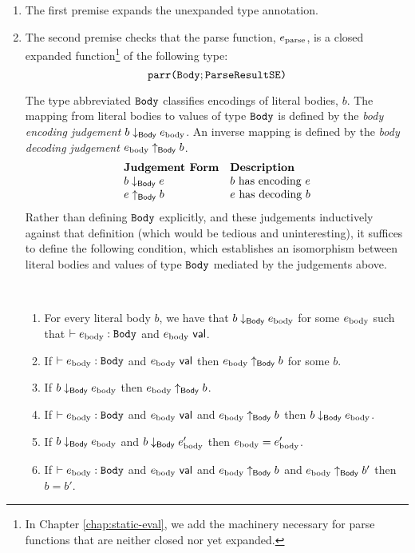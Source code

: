 \begin{enumerate}
\item The first premise expands the unexpanded type annotation.

\item The second premise checks that the parse function, $e_\text{parse}$, is a closed expanded function\footnote{In Chapter \ref{chap:static-eval}, we add the machinery necessary for parse functions that are neither closed nor yet expanded.} of the following type: \[\texttt{parr}\texttt{(}\mathtt{Body}; \mathtt{ParseResultSE}\texttt{)}\] 


The type abbreviated $\mathtt{Body}$ classifies encodings of literal bodies, $b$. The mapping from literal bodies to values of type $\mathtt{Body}$ is defined by the \emph{body encoding judgement} $b \downarrow_\mathsf{Body} e_\text{body}$. An inverse mapping is defined   by the \emph{body decoding judgement} $e_\text{body} \uparrow_\mathsf{Body} b$.
\[\begin{array}{ll}
\textbf{Judgement Form} & \textbf{Description}\\
b \downarrow_\mathsf{Body} e & \text{$b$ has encoding $e$}\\
e \uparrow_\mathsf{Body} b & \text{$e$ has decoding $b$}
\end{array}\]
Rather than defining $\mathtt{Body}$ explicitly, and these judgements inductively against that definition (which would be tedious and uninteresting), it suffices to define the following condition, which establishes an isomorphism between literal bodies and values of type $\mathtt{Body}$ mediated by the judgements above.

\begingroup
\def\thetheorem{\ref{condition:body-isomorphism}}
\begin{condition} ~
\begin{enumerate}
\item For every literal body $b$, we have that $b \downarrow_\mathsf{Body} e_\text{body}$ for some $e_\text{body}$ such that $\vdash e_\text{body} : \mathtt{Body}$ and $e_\text{body}~\mathsf{val}$.
\item If $\vdash e_\text{body} : \mathtt{Body}$ and $e_\text{body}~\mathsf{val}$ then $e_\text{body} \uparrow_\mathsf{Body} b$ for some $b$.
\item If $b \downarrow_\mathsf{Body} e_\text{body}$ then $e_\text{body} \uparrow_\mathsf{Body} b$.
\item If $\vdash e_\text{body} : \mathtt{Body}$ and $e_\text{body}~\mathsf{val}$ and $e_\text{body} \uparrow_\mathsf{Body} b$ then $b \downarrow_\mathsf{Body} e_\text{body}$. 
\item If $b \downarrow_\mathsf{Body} e_\text{body}$ and $b \downarrow_\mathsf{Body} e_\text{body}'$ then $e_\text{body} = e_\text{body}'$.
\item If $\vdash e_\text{body} : \mathtt{Body}$ and $e_\text{body}~\mathsf{val}$ and $e_\text{body} \uparrow_\mathsf{Body} b$ and $e_\text{body} \uparrow_\mathsf{Body} b'$ then $b=b'$.
\end{enumerate}
\end{condition}
\endgroup


\end{enumerate}

